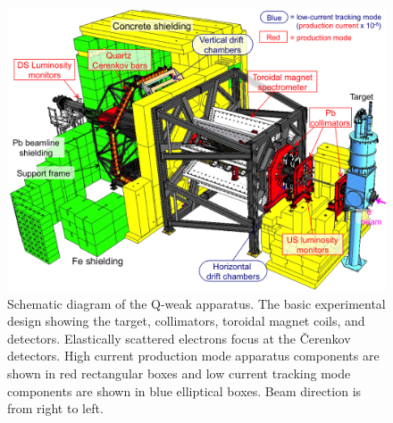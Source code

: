 
\begin{singlespace}
\begin{figure}[!h]
	\begin{center}
	\includegraphics[width=15.0cm]{figures/Q-weak_Appratus}
	\end{center}
	\caption
	{Schematic diagram of the Q-weak apparatus. The basic experimental design showing the target, collimators, toroidal magnet coils, and detectors. Elastically scattered electrons focus at the \v{C}erenkov detectors. High current production mode apparatus components are shown in red rectangular boxes and low current tracking mode components are shown in blue elliptical boxes. Beam direction is from right to left.}
	\label{fig:qweakApparatus}
\end{figure}
\end{singlespace}
	
